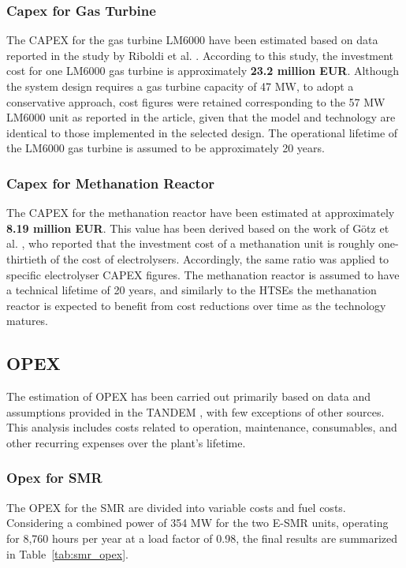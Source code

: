 \subsubsection {Capex for Gas Turbine}
The CAPEX for the gas turbine LM6000 have been estimated based on data reported in the study by Riboldi et al. \cite{Riboldi2020}. According to this study, the investment cost for one LM6000 gas turbine is approximately \textbf{23.2 million EUR}. Although the system design requires a gas turbine capacity of 47 MW, to adopt a conservative approach, cost figures were retained corresponding to the 57 MW LM6000 unit as reported in the article, given that the model and technology are identical to those implemented in the selected design. The operational lifetime of the LM6000 gas turbine is assumed to be approximately 20 years.

\subsubsection {Capex for Methanation Reactor}
The CAPEX for the methanation reactor have been estimated at approximately \textbf{8.19 million EUR}. This value has been derived based on the work of Götz et al. \cite{Gotz2016}, who reported that the investment cost of a methanation unit is roughly one-thirtieth of the cost of electrolysers. Accordingly, the same ratio was applied to specific electrolyser CAPEX figures. The methanation reactor is assumed to have a technical lifetime of 20 years, and similarly to the HTSEs the methanation reactor is expected to benefit from cost reductions over time as the technology matures.

\subsection{OPEX}
The estimation of OPEX has been carried out primarily based on data and assumptions provided in the TANDEM \cite{TANDEM2023}, with few exceptions of other sources. This analysis includes costs related to operation, maintenance, consumables, and other recurring expenses over the plant’s lifetime.

\subsubsection{Opex for SMR}
The OPEX for the SMR are divided into variable costs and fuel costs.
Considering a combined power of 354 MW for the two E-SMR units, operating for 8,760 hours per year at a load factor of 0.98, the final results are summarized in Table~\ref{tab:smr_opex}.

